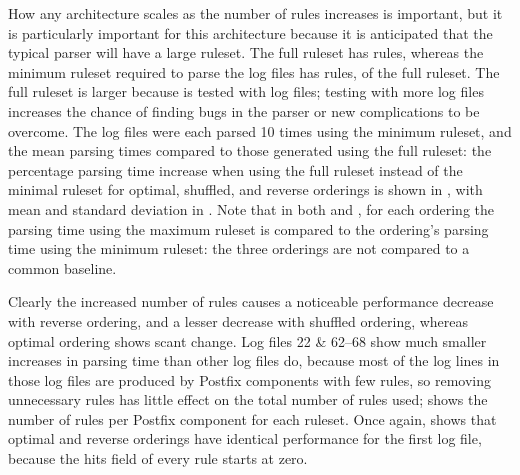 How any architecture scales as the number of rules increases is important,
but it is particularly important for this architecture because it is
anticipated that the typical parser will have a large ruleset.  The full
\parsername{} ruleset has \numberOFrules{} rules, whereas the minimum
ruleset required to parse the \numberOFlogFILES{} log files has
\numberOFrulesMINIMUM{} rules, \numberOFrulesMINIMUMpercentage{} of the
full ruleset.  The full ruleset is larger because \parsername{} is tested
with \numberOFlogFILESall{} log files; testing with more log files
increases the chance of finding bugs in the parser or new complications to
be overcome.  The \numberOFlogFILES{} log files were each parsed 10 times
using the minimum ruleset, and the mean parsing times compared to those
generated using the full ruleset: the percentage parsing time increase when
using the full ruleset instead of the minimal ruleset for optimal,
shuffled, and reverse orderings is shown in , with mean and standard deviation in .  Note that in both  and
, for each ordering the parsing time
using the maximum ruleset is compared to the ordering's parsing time using
the minimum ruleset: the three orderings are not compared to a common
baseline.

Clearly the increased number of rules causes a noticeable performance
decrease with reverse ordering, and a lesser decrease with shuffled
ordering, whereas optimal ordering shows scant change.  Log files 22 \&
62--68 show much smaller increases in parsing time than other log files do,
because most of the log lines in those log files are produced by Postfix
components with few rules, so removing unnecessary rules has little effect
on the total number of rules used;  shows the number of rules
per Postfix component for each ruleset.  Once again,  shows that optimal and reverse orderings have identical
performance for the first log file, because the hits field of every rule
starts at zero.


